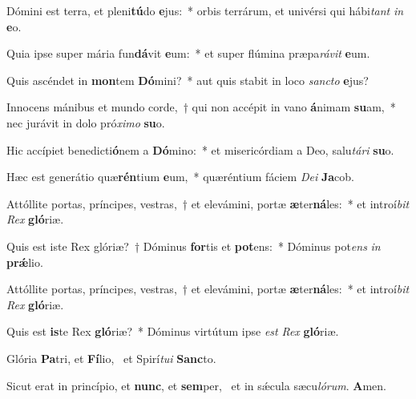 \item Dómini est terra, et pleni\textbf{tú}do \textbf{e}jus:~* orbis terrárum, et univérsi qui hábi\textit{tant} \textit{in} \textbf{e}o.
\item Quia ipse super mária fun\textbf{dá}vit \textbf{e}um:~* et super flúmina præpa\textit{rá}\textit{vit} \textbf{e}um.
\item Quis ascéndet in \textbf{mon}tem \textbf{Dó}mini?~* aut quis stabit in loco \textit{sanc}\textit{to} \textbf{e}jus?
\item Innocens mánibus et mundo corde,~† qui non accépit in vano \textbf{á}nimam \textbf{su}am,~* nec jurávit in dolo pró\textit{xi}\textit{mo} \textbf{su}o.
\item Hic accípiet benedicti\textbf{ó}nem a \textbf{Dó}mino:~* et misericórdiam a Deo, salu\textit{tá}\textit{ri} \textbf{su}o.
\item Hæc est generátio quæ\textbf{rén}tium \textbf{e}um,~* quæréntium fáciem \textit{De}\textit{i} \textbf{Ja}cob.
\item Attóllite portas, príncipes, vestras,~† et elevámini, portæ \textbf{æ}ter\textbf{ná}les:~* et introí\textit{bit} \textit{Rex} \textbf{gló}riæ.
\item Quis est iste Rex glóriæ?~† Dóminus \textbf{for}tis et \textbf{pot}ens:~* Dóminus pot\textit{ens} \textit{in} \textbf{prǽ}lio.
\item Attóllite portas, príncipes, vestras,~† et elevámini, portæ \textbf{æ}ter\textbf{ná}les:~* et introí\textit{bit} \textit{Rex} \textbf{gló}riæ.
\item Quis est \textbf{is}te Rex \textbf{gló}riæ?~* Dóminus virtútum ipse \textit{est} \textit{Rex} \textbf{gló}riæ.
\item Glória \textbf{Pa}tri, et \textbf{Fí}lio,~\psstar{} et Spirí\textit{tu}\textit{i} \textbf{Sanc}to.
\item Sicut erat in princípio, et \textbf{nunc}, et \textbf{sem}per,~\psstar{} et in sǽcula sæcu\textit{ló}\textit{rum}. \textbf{A}men.